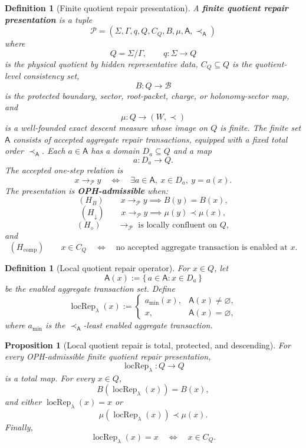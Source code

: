 \documentclass[11pt]{article}
\newtheorem{definition}[theorem]{Definition}
\newtheorem{proposition}[theorem]{Proposition}
\theoremstyle{remark}
\theoremstyle{plain}
\begin{document}
\begin{definition}[Finite quotient repair presentation]\label{def:finite-quotient-repair-presentation}
A \textbf{finite quotient repair presentation} is a tuple
\[
\mathcal P=(\Sigma,\Gamma,q,Q,C_Q,B,\mu,\mathsf A,\prec_{\mathsf A})
\]
where
\[
Q=\Sigma/\Gamma,\qquad q:\Sigma\to Q
\]
is the physical quotient by hidden representative data, \(C_Q\subseteq Q\) is the
quotient-level consistency set,
\[
B:Q\to\mathcal B
\]
is the protected boundary, sector, root-packet, charge, or holonomy-sector map, and
\[
\mu:Q\to(W,\prec)
\]
is a well-founded exact descent measure whose image on \(Q\) is finite.  The finite set
\(\mathsf A\) consists of accepted aggregate repair transactions, equipped with a fixed total
order \(\prec_{\mathsf A}\).  Each \(a\in\mathsf A\) has a domain \(D_a\subseteq Q\) and a map
\[
a:D_a\to Q.
\]
The accepted one-step relation is
\[
x\to_{\mathcal P} y
\quad\Longleftrightarrow\quad
\exists a\in\mathsf A,\ x\in D_a,\ y=a(x).
\]
The presentation is \textbf{OPH-admissible} when:
\[
(H_B)\qquad x\to_{\mathcal P}y\implies B(y)=B(x),
\]
\[
(H_\downarrow)\qquad x\to_{\mathcal P}y\implies \mu(y)\prec\mu(x),
\]
\[
(H_\diamond)\qquad \to_{\mathcal P}\text{ is locally confluent on }Q,
\]
and
\[
(H_{\mathrm{comp}})\qquad
x\in C_Q
\quad\Longleftrightarrow\quad
\text{no accepted aggregate transaction is enabled at }x.
\]
\end{definition}

\begin{definition}[Local quotient repair operator]\label{def:local-quotient-repair-operator}
For \(x\in Q\), let
\[
\mathsf A(x):=\{\,a\in\mathsf A:x\in D_a\,\}
\]
be the enabled aggregate transaction set.  Define
\[
\operatorname{locRep}_\lambda(x):=
\begin{cases}
a_{\min}(x),& \mathsf A(x)\ne\varnothing,\\
x,& \mathsf A(x)=\varnothing,
\end{cases}
\]
where \(a_{\min}\) is the \(\prec_{\mathsf A}\)-least enabled aggregate transaction.
\end{definition}

\begin{proposition}[Local quotient repair is total, protected, and descending]\label{prop:local-quotient-repair}
For every OPH-admissible finite quotient repair presentation,
\[
\operatorname{locRep}_\lambda:Q\to Q
\]
is a total map.  For every \(x\in Q\),
\[
B(\operatorname{locRep}_\lambda(x))=B(x),
\]
and either \(\operatorname{locRep}_\lambda(x)=x\) or
\[
\mu(\operatorname{locRep}_\lambda(x))\prec\mu(x).
\]
Finally,
\[
\operatorname{locRep}_\lambda(x)=x
\quad\Longleftrightarrow\quad
x\in C_Q.
\]
\end{proposition}
\end{document}
